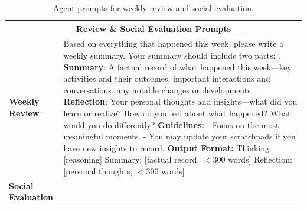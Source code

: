\begin{table}[h]
\centering
\caption{Agent prompts for weekly review and social evaluation.}
\label{tab:prompts_review_social}
\begin{tabular}{p{0.8in}p{4.3in}}
\toprule
\multicolumn{2}{c}{\textbf{Review \& Social Evaluation Prompts}} \\
\midrule

\textbf{Weekly \newline Review} &

Based on everything that happened this week, please write a weekly summary.
Your summary should include two parts:
\vspace{3pt}\newline
1. \textbf{Summary}: A factual record of what happened this week---key activities and their outcomes, important interactions and conversations, any notable changes or developments.
\vspace{2pt}\newline
2. \textbf{Reflection}: Your personal thoughts and insights---what did you learn or realize? How do you feel about what happened? What would you do differently?
\vspace{4pt}\newline
\textbf{Guidelines:}
\newline - Focus on the most meaningful moments.
\newline - You may update your scratchpads if you have new insights to record.
\vspace{4pt}\newline
\textbf{Output Format:}
\newline Thinking: [reasoning]
\newline Summary: [factual record, $<$300 words]
\newline Reflection: [personal thoughts, $<$300 words]

\\
\midrule

\textbf{Social \newline Evaluation} &


\end{tabular}
\end{table}
